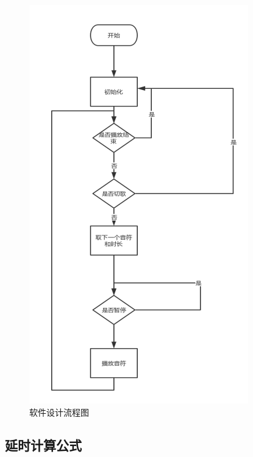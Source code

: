 \begin{figure}[H]
\centering
\includegraphics[width=\textwidth]{images/flow7.png}
\caption{软件设计流程图}
\label{fig:flow7}
\end{figure}

\subsection{延时计算公式}

